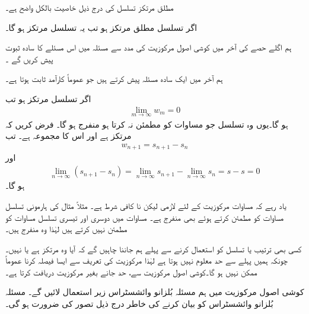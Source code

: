 مطلق مرتکز تسلسل کی درج ذیل خاصیت بالکل واضح ہے۔

اگر تسلسل  مطلق مرتکز ہو تب یہ تسلسل مرتکز ہو گا۔

ہم اگلے حصے کی آخر میں کوشی اصول مرکوزیت کی مدد سے مسئلہ  میں   اس مسئلے کا سادہ ثبوت پیش کریں گے ۔

ہم آخر میں ایک سادہ مسئلہ پیش کرتے ہیں جو عموماً کارآمد ثابت ہوتا ہے۔

اگر تسلسل  مرتکز ہو تب
\begin{align}\label{مساوات_ترتیب_مرکوزیت_شرط}
\lim_{m\to\infty} w_m=0
\end{align}
ہو گا۔یوں وہ تسلسل جو مساوات  کو مطمئن نہ کرتا ہو منفرج ہو گا۔
\quad
فرض کریں کہ  مرتکز ہے اور اس کا مجموعہ  ہے۔ تب 
\begin{align*}
w_{n+1}=s_{n+1}-s_n
\end{align*}
اور
\begin{align*}
\lim_{n\to\infty} (s_{n+1}-s_n)=\lim_{n\to\infty}s_{n+1} -\lim_{n\to\infty}s_n=s-s=0
\end{align*}
ہو گا۔

یاد رہے کہ مساوات  مرکوزیت کے لئے لازمی لیکن نا کافی شرط ہے۔ مثلاً مثال  کی ہارمونی تسلسل مساوات  کو مطمئن کرتے ہوئے بھی  منفرج ہے۔  مساوات  میں دوسری اور تیسری تسلسل مساوات   کو مطمئن نہیں کرتے ہیں لہٰذا وہ منفرج ہیں۔

کسی بھی ترتیب یا تسلسل کو استعمال کرنے سے پہلے ہم جاننا چاہیں گے کہ آیا وہ مرتکز ہے یا نہیں۔چونکہ ہمیں پہلے سے حد معلوم نہیں ہوتا ہے لہٰذا مرکوزیت کی تعریف سے ایسا فیصلہ کرنا عموماً ممکن نہیں ہو گا۔کوشی اصول مرکوزیت سے، حد جانے بغیر مرکوزیت دریافت کرتا ہے۔

کوشی اصول مرکوزیت میں ہم  مسئلہ بُلزانو وائشسٹراس زیر استعمال لائیں گے۔ مسئلہ بُلزانو وائشسٹراس کو بیان کرنے کی خاطر درج ذیل تصور کی ضرورت ہو گی۔  

